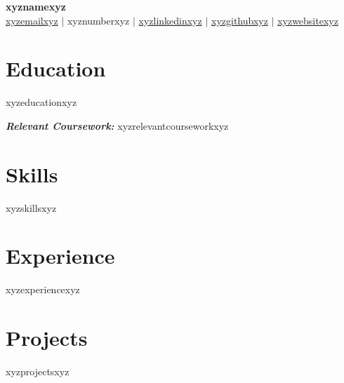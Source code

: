 \documentclass[a4paper,10pt]{article}
\begin{document}
\pagestyle{empty}

\begin{center}
    \textbf{\LARGE xyznamexyz} \\
    \vspace{7pt}
    \href{mailto:xyzemailxyz}{xyzemailxyz} $\vert$ xyznumberxyz $\vert$ \href{xyzlinkedinxyz}{\faLinkedin  { } xyzlinkedinxyz} $\vert$ \href{xyzgithubxyz}{\faGithub { } xyzgithubxyz} $\vert$ \href{xyzwebsitexyz}{xyzwebsitexyz}

\end{center}

\vspace{-20pt}
\section*{Education}
\vspace{-5pt}

\begin{itemize}
    xyzeducationxyz \\
\end{itemize}
\vspace{-5pt}
    \textit{\textbf{Relevant Coursework:}} xyzrelevantcourseworkxyz

\vspace{-10pt}
\section*{Skills}
\vspace{-5pt}
\begin{itemize}
   xyzskillsxyz
\end{itemize}

\vspace{-10pt}
\section*{Experience}
\vspace{-3pt}
xyzexperiencexyz
\vspace{-10pt}
\section*{Projects}
\vspace{-3pt}
xyzprojectsxyz
\end{document}
